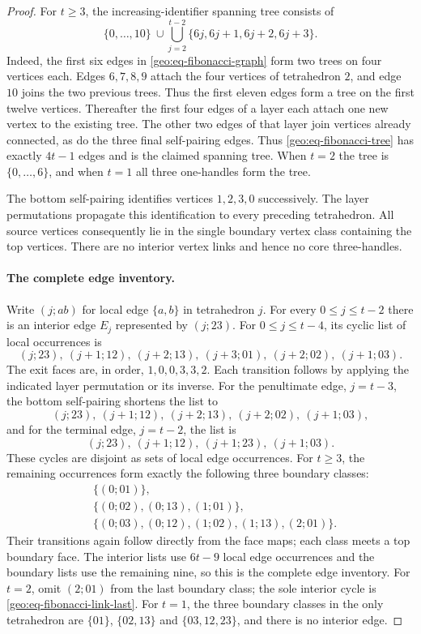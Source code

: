 \begin{proof}
For $t\ge3$, the increasing-identifier spanning tree consists of
\[
 \{0,\ldots,10\}\ \cup\!
 \bigcup_{j=2}^{t-2}\{6j,6j+1,6j+2,6j+3\}.
 \tag{G14}\label{geo:eq-fibonacci-tree}
\]
Indeed, the first six edges in \eqref{geo:eq-fibonacci-graph} form two
trees on four vertices each.  Edges $6,7,8,9$ attach the four vertices of
tetrahedron $2$, and edge $10$ joins the two previous trees.  Thus the first
eleven edges form a tree on the first twelve vertices.  Thereafter the
first four edges of a layer each attach one new vertex to the existing tree.  The other two
edges of that layer join vertices already connected, as do the three
final self-pairing edges.  Thus \eqref{geo:eq-fibonacci-tree} has exactly
$4t-1$ edges and is the claimed spanning tree.  When $t=2$ the tree is
$\{0,\ldots,6\}$, and when $t=1$ all three one-handles form the tree.

The bottom self-pairing identifies vertices $1,2,3,0$ successively.  The
layer permutations propagate this identification to every preceding
tetrahedron.  All source vertices consequently lie in the single boundary
vertex class containing the top vertices.  There are no interior vertex
links and hence no core three-handles.

\paragraph{The complete edge inventory.}
Write $(j;ab)$ for local edge $\{a,b\}$ in tetrahedron $j$.  For every
$0\le j\le t-2$ there is an interior edge $E_j$ represented by $(j;23)$.
For $0\le j\le t-4$, its cyclic list of local occurrences is
\[
 (j;23),\ (j+1;12),\ (j+2;13),\ (j+3;01),\
 (j+2;02),\ (j+1;03).
 \tag{G15}\label{geo:eq-fibonacci-link-general}
\]
The exit faces are, in order, $1,0,0,3,3,2$.  Each transition follows by
applying the indicated layer permutation or its inverse.  For the
penultimate edge, $j=t-3$, the bottom self-pairing shortens the list to
\[
 (j;23),\ (j+1;12),\ (j+2;13),\ (j+2;02),\ (j+1;03),
 \tag{G16}\label{geo:eq-fibonacci-link-penultimate}
\]
and for the terminal edge, $j=t-2$, the list is
\[
 (j;23),\ (j+1;12),\ (j+1;23),\ (j+1;03).
 \tag{G17}\label{geo:eq-fibonacci-link-last}
\]
These cycles are disjoint as sets of local edge occurrences.  For
$t\ge3$, the remaining occurrences form exactly the following three
boundary classes:
\[
\begin{split}
 &\{(0;01)\},\\
 &\{(0;02),(0;13),(1;01)\},\\
 &\{(0;03),(0;12),(1;02),(1;13),(2;01)\}.
\end{split}
 \tag{G18}\label{geo:eq-fibonacci-boundary-edges}
\]
Their transitions again follow directly from the face maps; each class
meets a top boundary face.  The interior lists use $6t-9$ local edge
occurrences and the boundary lists use the remaining nine, so this is the
complete edge inventory.  For $t=2$, omit $(2;01)$ from the last boundary
class; the sole interior cycle is \eqref{geo:eq-fibonacci-link-last}.  For
$t=1$, the three boundary classes in the only tetrahedron are
$\{01\}$, $\{02,13\}$ and $\{03,12,23\}$, and there is no interior edge.


\end{proof}

